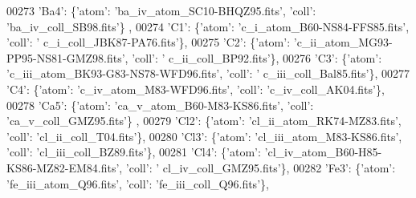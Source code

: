 \begin{DoxyCode}
00273                              \textcolor{stringliteral}{'Ba4'}: \{\textcolor{stringliteral}{'atom'}: \textcolor{stringliteral}{'ba\_iv\_atom\_SC10-BHQZ95.fits'}, \textcolor{stringliteral}{'coll'}: \textcolor{stringliteral}{'ba\_iv\_coll\_SB98.fits'}\}
      ,
00274                              \textcolor{stringliteral}{'C1'}: \{\textcolor{stringliteral}{'atom'}: \textcolor{stringliteral}{'c\_i\_atom\_B60-NS84-FFS85.fits'}, \textcolor{stringliteral}{'coll'}: \textcolor{stringliteral}{'
      c\_i\_coll\_JBK87-PA76.fits'}\},
00275                              \textcolor{stringliteral}{'C2'}: \{\textcolor{stringliteral}{'atom'}: \textcolor{stringliteral}{'c\_ii\_atom\_MG93-PP95-NS81-GMZ98.fits'}, \textcolor{stringliteral}{'coll'}: \textcolor{stringliteral}{'
      c\_ii\_coll\_BP92.fits'}\},
00276                              \textcolor{stringliteral}{'C3'}: \{\textcolor{stringliteral}{'atom'}: \textcolor{stringliteral}{'c\_iii\_atom\_BK93-G83-NS78-WFD96.fits'}, \textcolor{stringliteral}{'coll'}: \textcolor{stringliteral}{'
      c\_iii\_coll\_Bal85.fits'}\},
00277                              \textcolor{stringliteral}{'C4'}: \{\textcolor{stringliteral}{'atom'}: \textcolor{stringliteral}{'c\_iv\_atom\_M83-WFD96.fits'}, \textcolor{stringliteral}{'coll'}: \textcolor{stringliteral}{'c\_iv\_coll\_AK04.fits'}\},
00278                              \textcolor{stringliteral}{'Ca5'}: \{\textcolor{stringliteral}{'atom'}: \textcolor{stringliteral}{'ca\_v\_atom\_B60-M83-KS86.fits'}, \textcolor{stringliteral}{'coll'}: \textcolor{stringliteral}{'ca\_v\_coll\_GMZ95.fits'}\}
      ,
00279                              \textcolor{stringliteral}{'Cl2'}: \{\textcolor{stringliteral}{'atom'}: \textcolor{stringliteral}{'cl\_ii\_atom\_RK74-MZ83.fits'}, \textcolor{stringliteral}{'coll'}: \textcolor{stringliteral}{'cl\_ii\_coll\_T04.fits'}\},
00280                              \textcolor{stringliteral}{'Cl3'}: \{\textcolor{stringliteral}{'atom'}: \textcolor{stringliteral}{'cl\_iii\_atom\_M83-KS86.fits'}, \textcolor{stringliteral}{'coll'}: \textcolor{stringliteral}{'cl\_iii\_coll\_BZ89.fits'}\},
00281                              \textcolor{stringliteral}{'Cl4'}: \{\textcolor{stringliteral}{'atom'}: \textcolor{stringliteral}{'cl\_iv\_atom\_B60-H85-KS86-MZ82-EM84.fits'}, \textcolor{stringliteral}{'coll'}: \textcolor{stringliteral}{'
      cl\_iv\_coll\_GMZ95.fits'}\},
00282                              \textcolor{stringliteral}{'Fe3'}: \{\textcolor{stringliteral}{'atom'}: \textcolor{stringliteral}{'fe\_iii\_atom\_Q96.fits'}, \textcolor{stringliteral}{'coll'}: \textcolor{stringliteral}{'fe\_iii\_coll\_Q96.fits'}\},

\end{DoxyCode}
